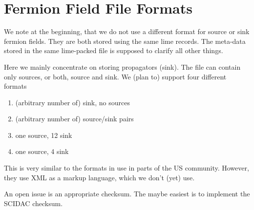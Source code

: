 \section{Fermion Field File Formats}

We note at the beginning, that we do not use a different format for
source or sink fermion fields. They are both stored using the same
lime records. The meta-data stored in the same lime-packed file is
supposed to clarify all other things.

Here we mainly concentrate on storing propagators (sink). The file can
contain only sources, or both, source and sink. We (plan to) support
four different formats
\begin{enumerate}
\item (arbitrary number of) sink, no sources
\item (arbitrary number of) source/sink pairs
\item one source, 12 sink
\item one source, 4 sink
\end{enumerate}
This is very similar to the formats in use in parts of the US
community. However, they use XML as a markup language, which we don't
(yet) use.

An open issue is an appropriate checksum. The maybe easiest is to
implement the SCIDAC checksum.

